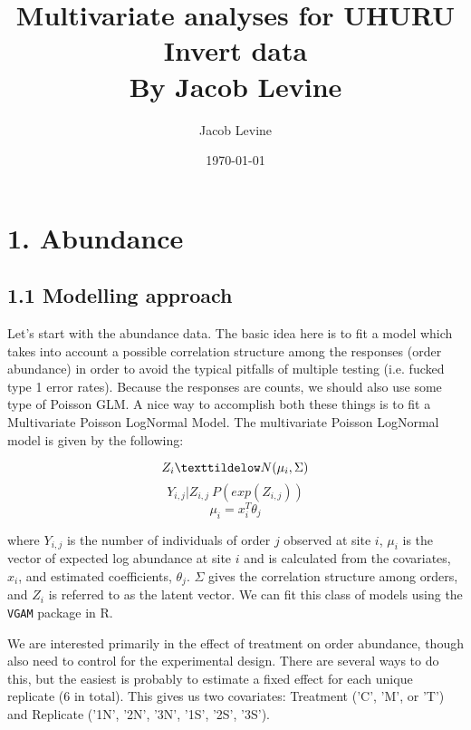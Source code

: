 \documentclass[11pt]{article}
\author{Jacob Levine}
\date{\today}
\title{Multivariate analyses for UHURU Invert data\\\medskip
\large By Jacob Levine}
\begin{document}
\maketitle
\tableofcontents


\section*{1. Abundance}
\label{sec:orgec52b52}

\subsection*{1.1 Modelling approach}
\label{sec:orgddeab02}

Let's start with the abundance data. The basic idea here is to fit a model which takes into account a possible correlation structure among the responses (order abundance) in order to avoid the typical pitfalls of multiple testing (i.e. fucked type 1 error rates). Because the responses are counts, we should also use some type of Poisson GLM. A nice way to accomplish both these things is to fit a Multivariate Poisson LogNormal Model. The multivariate Poisson LogNormal model is given by the following:

\begin{equation*}
Z_i \texttildelow N(\mu_i, \Sigma)
\end{equation*}
\begin{equation}
Y_{i,j} | Z_{i,j} ~ P(exp(Z_{i,j}))
\end{equation}
\begin{equation*}
\mu_i = x_i^T\theta_j
\end{equation*}


where \(Y_{i,j}\) is the number of individuals of order \(j\) observed at site \(i\), \(\mu_i\) is the vector of expected log abundance at site \(i\) and is calculated from the covariates, \(x_i\), and estimated coefficients, \(\theta_j\). \(\Sigma\) gives the correlation structure among orders, and \(Z_i\) is referred to as the latent vector. We can fit this class of models using the \texttt{VGAM} package in R.

We are interested primarily in the effect of treatment on order abundance, though also need to control for the experimental design. There are several ways to do this, but the easiest is probably to estimate a fixed effect for each unique replicate (6 in total). This gives us two covariates: Treatment ('C', 'M', or 'T') and Replicate ('1N', '2N', '3N', '1S', '2S', '3S').
\end{document}
